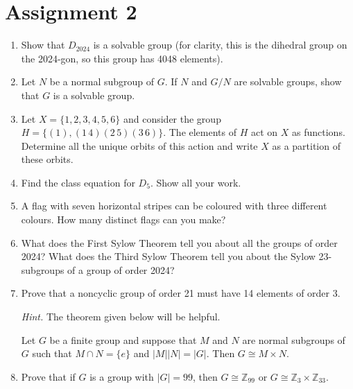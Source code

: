 \vfill\pagebreak

\section*{Assignment 2}

\begin{enumerate}[label={\sffamily\bfseries\color{main}\arabic*.}]
	\item Show that $D_{2024}$ is a solvable group (for clarity, this is the dihedral group on the 2024-gon, so this group has 4048 elements).

	\item Let $N$ be a normal subgroup of $G$. If $N$ and $G/N$ are solvable groups, show that $G$ is a solvable group.

	\item Let $X=\{1,2,3,4,5,6\}$ and consider the group $H=\{(1),(1\, 4)(2\, 5)(3\, 6)\}$. The elements of $H$ act on $X$ as functions. Determine all the unique orbits of this action and write $X$ as a partition of these orbits.

	\item Find the class equation for $D_5$. Show all your work.

	\item A flag with seven horizontal stripes can be coloured with three different colours. How many distinct flags can you make?

	\item What does the First Sylow Theorem tell you about all the groups of order 2024? What does the Third Sylow Theorem tell you about the Sylow 23-subgroups of a group of order 2024?

	\item Prove that a noncyclic group of order 21 must have 14 elements of order 3.

	{\footnotesize\textit{\color{main}Hint.} The theorem given below will be helpful.\par}

	\begin{theorem*}
		Let $G$ be a finite group and suppose that $M$ and $N$ are normal subgroups of $G$ such that $M\cap N=\{e\}$ and $|M||N|=|G|$. Then $G\cong M\times N$.
	\end{theorem*}

	\item Prove that if $G$ is a group with $|G|=99$, then $G\cong\mathbb Z_{99}$ or $G\cong\mathbb Z_3\times\mathbb Z_{33}$.


\end{enumerate}
